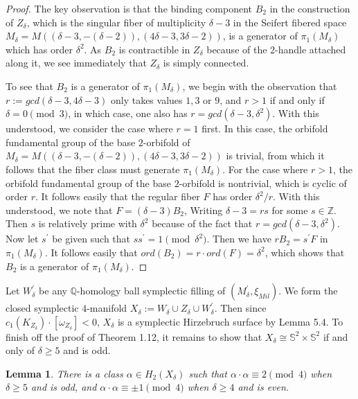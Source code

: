 \documentclass[11pt]{amsart}
\theoremstyle{plain}
\numberwithin{theorem}{section}
\newtheorem{lemma}[theorem]{Lemma}
\theoremstyle{definition}
\newcommand{\Z}{{\mathbb Z}}
\newcommand{\Q}{{\mathbb Q}}
\newcommand{\s}{{\mathbb S}}
\begin{document}
\begin{proof}
The key observation is that the binding component $B_2$ in the construction of $Z_\delta$, which is
the singular fiber of multiplicity $\delta-3$ in the Seifert fibered space 
$M_\delta=M((\delta-3, -(\delta-2)), (4\delta-3, 3\delta-2))$, is a generator of $\pi_1(M_\delta)$ which has order $\delta^2$. As $B_2$ is contractible in $Z_\delta$ because of the $2$-handle attached along it, we see immediately that $Z_\delta$ is simply connected.

To see that $B_2$ is a generator of $\pi_1(M_\delta)$, we begin with the observation that 
$r:=gcd(\delta-3,4\delta-3)$ only takes values $1,3$ or $9$, and $r>1$ if and only if 
$\delta=0\pmod{3}$, in which case, one also has $r=gcd(\delta-3,\delta^2)$. With this understood, we consider the case where $r=1$ first. In this case, the orbifold fundamental group of the base $2$-orbifold of $M_\delta=M((\delta-3, -(\delta-2)), (4\delta-3, 3\delta-2))$ is trivial, from which it follows 
that the fiber class must generate $\pi_1(M_\delta)$. For the case where $r>1$, the orbifold fundamental group of the base $2$-orbifold is nontrivial, which is cyclic of order $r$. It follows easily that the regular fiber $F$ has order $\delta^2/r$. With this understood, we note that $F=(\delta-3)B_2$, Writing $\delta-3=rs$ for some $s\in\Z$. Then $s$ is relatively prime with $\delta^2$ because of the fact that $r=gcd(\delta-3,\delta^2)$. Now let $s^\prime$ be given such that $ss^\prime=1\pmod{\delta^2}$. Then we have $rB_2=s^\prime F$ in $\pi_1(M_\delta)$. It follows easily that $ord(B_2)=r\cdot ord(F)=\delta^2$, which shows that $B_2$ is a generator of $\pi_1(M_\delta)$. 

\end{proof}

Let $W_\delta^\prime$ be any $\Q$-homology ball symplectic filling of $(M_\delta^\prime,\xi_{Mil})$.
We form the closed symplectic $4$-manifold $X_\delta:=W_\delta\cup Z_\delta \cup 
W_{\delta}^\prime$. Then since $c_1(K_{Z_\delta})\cdot [\omega_{Z_\delta}]<0$, $X_\delta$
is a symplectic Hirzebruch surface by Lemma 5.4. To finish off the proof of Theorem 1.12,
it remains to show that $X_\delta\cong \s^2\times \s^2$ if and only of $\delta\geq 5$ and is odd. 

\begin{lemma}
There is a class $\alpha\in H_2(X_\delta)$ such that $\alpha\cdot \alpha\equiv 2 \pmod{4}$
when  $\delta\geq 5$ and is odd, and $\alpha\cdot \alpha \equiv \pm 1 \pmod{4}$ when $\delta\geq 4$ and is even. 
\end{lemma}
\end{document}
